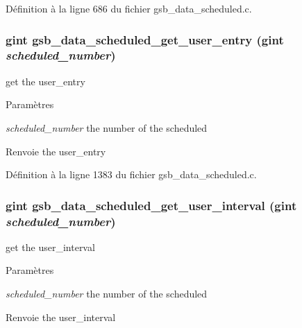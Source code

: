Définition à la ligne 686 du fichier gsb\_\-data\_\-scheduled.c.

\subsubsection[{gsb\_\-data\_\-scheduled\_\-get\_\-user\_\-entry}]{\setlength{\rightskip}{0pt plus 5cm}gint gsb\_\-data\_\-scheduled\_\-get\_\-user\_\-entry (gint {\em scheduled\_\-number})}\label{gsb__data__scheduled_8h_a7d7cfb1bc2ca105b20b5627c94981096}
get the user\_\-entry


\begin{DoxyParams}{Paramètres}
\item[{\em scheduled\_\-number}]the number of the scheduled\end{DoxyParams}
\begin{DoxyReturn}{Renvoie}
the user\_\-entry 
\end{DoxyReturn}


Définition à la ligne 1383 du fichier gsb\_\-data\_\-scheduled.c.

\subsubsection[{gsb\_\-data\_\-scheduled\_\-get\_\-user\_\-interval}]{\setlength{\rightskip}{0pt plus 5cm}gint gsb\_\-data\_\-scheduled\_\-get\_\-user\_\-interval (gint {\em scheduled\_\-number})}\label{gsb__data__scheduled_8h_aaf1176d8c782270fe8e4eec21937bf05}
get the user\_\-interval


\begin{DoxyParams}{Paramètres}
\item[{\em scheduled\_\-number}]the number of the scheduled\end{DoxyParams}
\begin{DoxyReturn}{Renvoie}
the user\_\-interval 
\end{DoxyReturn}


